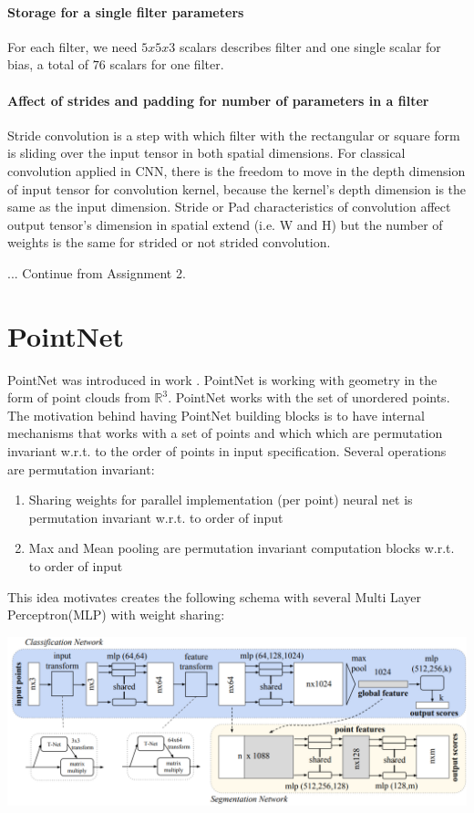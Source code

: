 \documentclass[12pt,a4paper]{article}
\theoremstyle{plain}
\begin{document}
\paragraph{Storage for a single filter parameters}
For each filter, we need $5x5x3$ scalars describes filter and one single scalar for bias, a total of $76$ scalars for one filter.

\paragraph{Affect of strides and padding for number of parameters in a filter}
Stride convolution is a step with which filter with the rectangular or square form is sliding over the input tensor in both spatial dimensions. For classical convolution applied in CNN, there is the freedom to move in the depth dimension of input tensor for convolution kernel, because the kernel’s depth dimension is the same as the input dimension. Stride or Pad characteristics of convolution affect output tensor’s dimension in spatial extend (i.e. W and H) but the number of weights is the same for strided or not strided convolution.


...
Continue from Assignment 2.

\section{PointNet}
PointNet was introduced in work \cite{qi2017pointnet}. PointNet is working with geometry in the form of point clouds from $\mathbb{R}^3$. PointNet works with the set of unordered points. The motivation behind having PointNet building blocks is to have internal mechanisms that works with a set of points and which which are permutation invariant w.r.t. to the order of points in input specification.  Several operations are permutation invariant:
\begin{enumerate}
	\item Sharing weights for parallel implementation (per point) neural net is permutation invariant w.r.t. to order of input
	\item Max and Mean pooling are permutation invariant computation blocks w.r.t. to order of input
\end{enumerate}

This idea motivates  creates the following schema with several Multi Layer Perceptron(MLP) with weight sharing:

\includegraphics[width=\textwidth, keepaspectratio=true]{pointnet.png}
\end{document}
